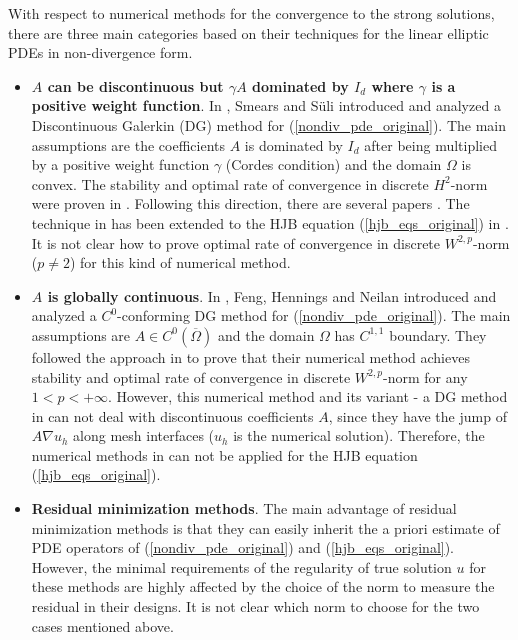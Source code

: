 \documentclass[12pt]{amsart}
\theoremstyle{definition}
\theoremstyle{remark}
\begin{document}
With respect to numerical methods for the convergence to the strong solutions, 
there are three main categories based on their techniques for the linear elliptic PDEs 
in non-divergence form. 
\begin{itemize}

\item[(I)] \textbf{$A$ can be discontinuous but $\gamma A$ dominated by $I_{d}$ where 
$\gamma$ is a positive weight function}. 
In \cite{SmearsSuli2013}, Smears and S\"uli introduced and analyzed a Discontinuous Galerkin 
(DG) method for (\ref{nondiv_pde_original}). The main assumptions are 
the coefficients $A$ is dominated by $I_{d}$ after being multiplied by a 
positive weight function $\gamma$ (Cordes condition) and the domain $\Omega$ is convex. 
The stability and optimal rate of convergence in discrete $H^{2}$-norm were 
proven in \cite{SmearsSuli2013}. Following this direction, there are several papers 
\cite{BHW2021,Gallistl1,Wu2021}. The technique in \cite{SmearsSuli2013} 
has been extended to the HJB equation (\ref{hjb_eqs_original}) in 
\cite{SmearsSuli2014,Gallistl2,Wu2021}. 
It is not clear how to prove optimal rate of convergence in  
discrete $W^{2,p}$-norm ($p\neq 2$) for this kind of numerical method.

\item[(II)] \textbf{$A$ is globally continuous}. In \cite{FHM2017}, Feng, Hennings and Neilan 
introduced and analyzed a $C^{0}$-conforming DG method for 
(\ref{nondiv_pde_original}). The main assumptions are $A \in C^{0}(\overline{\Omega})$ 
and the domain $\Omega$ has $C^{1,1}$ boundary. They followed the approach in 
\cite[Chapter~$9$]{GT01} to prove that their numerical 
method achieves stability and optimal rate of convergence 
in discrete $W^{2,p}$-norm for any $1 < p < +\infty$. 
However, this numerical method 
and its variant - a DG method in \cite{FNS1} can not deal with discontinuous 
coefficients $A$, since they have the jump of $A\nabla u_{h}$ along mesh interfaces 
($u_{h}$ is the numerical solution). Therefore, the numerical methods in 
\cite{FHM2017,FNS1} can not be applied for the HJB equation (\ref{hjb_eqs_original}).

\item[(III)] \textbf{Residual minimization methods}. 
The main advantage of residual minimization methods \cite{QiuZhang2020,Tran2025,GallistlTran2025} 
is that they can easily inherit the a priori estimate of PDE operators of (\ref{nondiv_pde_original}) 
and (\ref{hjb_eqs_original}). However, the minimal requirements of the regularity of 
true solution $u$ for these methods are highly 
affected by the choice of the norm to measure the residual in their designs. 
It is not clear which norm to choose for the two cases mentioned above.

\end{itemize}
\end{document}
